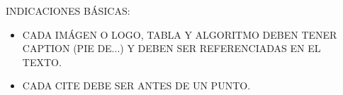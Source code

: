 \documentclass[12pt]{report}
\begin{document}
	
\maketitle

\cleardoublepage
{}
\setcounter{page}{1}




\tableofcontents
\listoffigures
\renewcommand{\listtablename}{Índice de tablas}\listoftables
\renewcommand{\lstlistlistingname}{Índice de algoritmos}
\lstlistoflistings

\cleardoublepage
{}
\setcounter{page}{1}


INDICACIONES BÁSICAS:
 \begin{itemize}
     \item CADA IMÁGEN O LOGO, TABLA Y ALGORITMO DEBEN TENER CAPTION (PIE DE...) Y DEBEN SER REFERENCIADAS EN EL TEXTO.
     \item CADA CITE DEBE SER ANTES DE UN PUNTO.
 \end{itemize}












\renewcommand{\refname}{Referencias}






\end{document}
